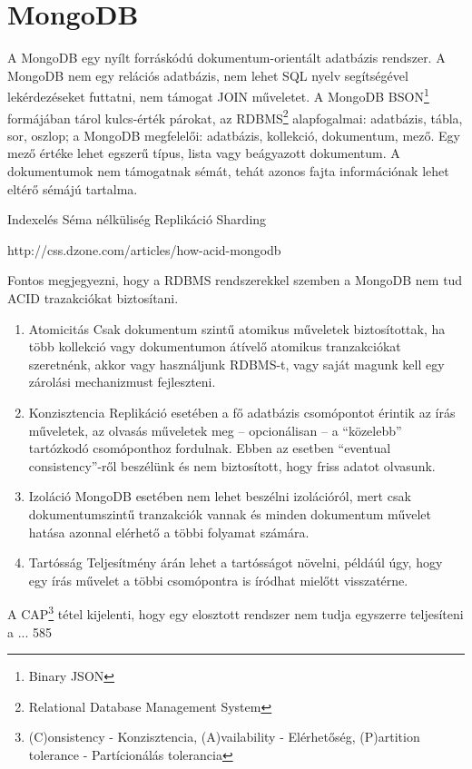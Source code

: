 \section{MongoDB}

A MongoDB egy nyílt forráskódú dokumentum-orientált adatbázis rendszer. A MongoDB nem egy relációs adatbázis, nem lehet SQL nyelv segítségével lekérdezéseket futtatni, nem támogat JOIN műveletet. A MongoDB BSON\footnote{Binary JSON} formájában tárol kulcs-érték párokat, az RDBMS\footnote{Relational Database Management System} alapfogalmai: adatbázis, tábla, sor, oszlop; a MongoDB megfelelői: adatbázis, kollekció, dokumentum, mező. Egy mező értéke lehet egszerű típus, lista vagy beágyazott dokumentum. A dokumentumok nem támogatnak sémát, tehát azonos fajta információnak lehet eltérő sémájú tartalma. 

Indexelés
Séma nélküliség
Replikáció
Sharding

http://css.dzone.com/articles/how-acid-mongodb

Fontos megjegyezni, hogy a RDBMS rendszerekkel szemben a MongoDB nem tud ACID trazakciókat biztosítani. 
\begin{enumerate}
\item{Atomicitás} Csak dokumentum szintű atomikus műveletek biztosítottak, ha több kollekció vagy dokumentumon átívelő atomikus tranzakciókat szeretnénk, akkor vagy használjunk RDBMS-t, vagy saját magunk kell egy zárolási mechanizmust fejleszteni.
\item{Konzisztencia} Replikáció esetében a fő adatbázis csomópontot érintik az írás műveletek, az olvasás műveletek meg -- opcionálisan --  a ``közelebb'' tartózkodó csomóponthoz fordulnak. Ebben az esetben ``eventual consistency''-ről beszélünk és nem biztosított, hogy friss adatot olvasunk.  
\item{Izoláció} MongoDB esetében nem lehet beszélni izolációról, mert csak dokumentumszintű tranzakciók vannak és minden dokumentum művelet hatása azonnal elérhető a többi folyamat számára. 
\item{Tartósság} Teljesítmény árán lehet a tartósságot növelni, példáúl úgy, hogy egy írás művelet a többi csomópontra is íródhat mielőtt visszatérne.
\end{enumerate}
A CAP\footnote{(C)onsistency - Konzisztencia, (A)vailability - Elérhetőség, (P)artition tolerance - Partícionálás tolerancia} tétel kijelenti, hogy egy elosztott rendszer nem tudja egyszerre teljesíteni a ...
585

